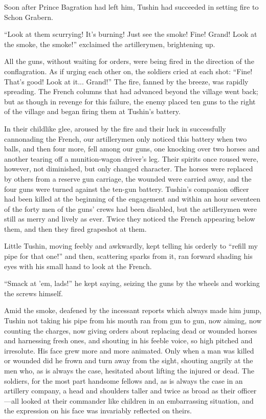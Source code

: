 Soon after Prince Bagration had left him, Tushin had succeeded in
setting fire to Schon Grabern.

``Look at them scurrying! It's burning! Just see the smoke! Fine!
Grand!  Look at the smoke, the smoke!'' exclaimed the
artillerymen, brightening up.

All the guns, without waiting for orders, were being fired in the
direction of the conflagration. As if urging each other on, the
soldiers cried at each shot: ``Fine! That's good! Look at
it... Grand!'' The fire, fanned by the breeze, was rapidly
spreading. The French columns that had advanced beyond the
village went back; but as though in revenge for this failure, the
enemy placed ten guns to the right of the village and began
firing them at Tushin's battery.

In their childlike glee, aroused by the fire and their luck in
successfully cannonading the French, our artillerymen only
noticed this battery when two balls, and then four more, fell
among our guns, one knocking over two horses and another tearing
off a munition-wagon driver's leg. Their spirits once roused
were, however, not diminished, but only changed character. The
horses were replaced by others from a reserve gun carriage, the
wounded were carried away, and the four guns were turned against
the ten-gun battery. Tushin's companion officer had been killed
at the beginning of the engagement and within an hour seventeen
of the forty men of the guns' crews had been disabled, but the
artillerymen were still as merry and lively as ever. Twice they
noticed the French appearing below them, and then they fired
grapeshot at them.

Little Tushin, moving feebly and awkwardly, kept telling his
orderly to ``refill my pipe for that one!'' and then, scattering
sparks from it, ran forward shading his eyes with his small hand
to look at the French.

``Smack at 'em, lads!'' he kept saying, seizing the guns by the
wheels and working the screws himself.

Amid the smoke, deafened by the incessant reports which always
made him jump, Tushin not taking his pipe from his mouth ran from
gun to gun, now aiming, now counting the charges, now giving
orders about replacing dead or wounded horses and harnessing
fresh ones, and shouting in his feeble voice, so high pitched and
irresolute. His face grew more and more animated. Only when a man
was killed or wounded did he frown and turn away from the sight,
shouting angrily at the men who, as is always the case, hesitated
about lifting the injured or dead. The soldiers, for the most
part handsome fellows and, as is always the case in an artillery
company, a head and shoulders taller and twice as broad as their
officer---all looked at their commander like children in an
embarrassing situation, and the expression on his face was
invariably reflected on theirs.

